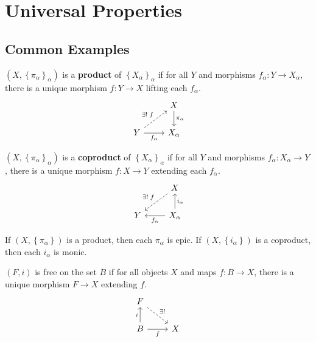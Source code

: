 \documentclass[twoside,10pt]{report}
\begin{document}
\chapter{Universal Properties}

\section{Common Examples}

\begin{defn}[]
$(X, \left\{ \pi_{\alpha} \right\}_{\alpha})$ is a \textbf{product} of $\left\{ X_{\alpha} \right\}_{\alpha}$ if for all $Y$ and morphisms $f_{\alpha}:Y\to X_{\alpha}$, there is a unique morphism $f:Y\to X$ lifting each $f_{\alpha}$.
\[
\begin{tikzcd}
	& X\dar{\pi_{\alpha}} \\
	Y \arrow[ur,dashed,"\exists!\;f"]\rar["f_{\alpha}"'] & X_{\alpha}
\end{tikzcd}
\] 
\end{defn}

\begin{defn}[]
	$(X,  \left\{ \pi_{\alpha} \right\}_{\alpha})$ is a \textbf{coproduct} of $\left\{ X_{\alpha} \right\}_{\alpha}$ if for all $Y$ and morphisms $f_{\alpha}:X_{\alpha}\to Y$, there is a unique morphism $f:X\to Y$ extending each $f_{\alpha}$.
	\[
	\begin{tikzcd}
		& X\arrow[dl,dashed,"\exists!\;f"'] \\
		Y & X_{\alpha}\lar{f_{\alpha}}\uar["i_{\alpha}"']
	\end{tikzcd}
	\] 
\end{defn}

\begin{prop}
	If $(X,\left\{ \pi_{\alpha} \right\})$ is a product, then each $\pi_{\alpha}$ is epic. If $(X,\left\{ i_{\alpha} \right\})$ is a coproduct, then each $i_{\alpha}$ is monic.
\end{prop}

\begin{defn}[]
	$(F, i)$ is free on the set $B$ if for all objects $X$ and maps $f:B\to X$, there is a unique morphism $F\to X$ extending $f$.
	\[
	\begin{tikzcd}
		F \arrow[dr,dashed,"\exists!"] \\
		B \uar{i}\rar["f"'] & X
	\end{tikzcd}
	\] 
\end{defn}
\end{document}

